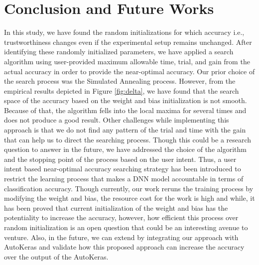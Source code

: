 \section{Conclusion and Future Works}
\label{sec:future}
In this study, we have found the random initializations for which accuracy i.e., trustworthiness changes even if the experimental setup remains unchanged. After identifying these randomly initialized parameters, we have applied a search algorithm using user-provided maximum allowable time, trial, and gain from the actual accuracy in order to provide the near-optimal accuracy. Our prior choice of the search process was the Simulated Annealing process. However, from the empirical results depicted in Figure \ref{fig:delta}, we have found that the search space of the accuracy based on the weight and bias initialization is not smooth. Because of that, the algorithm fells into the local maxima for several times and does not produce a good result. Other challenges while implementing this approach is that we do not find any pattern of the trial and time with the gain that can help us to direct the searching process. Though this could be a research question to answer in the future, we have addressed the choice of the algorithm and the stopping point of the process based on the user intent.
Thus, a user intent based near-optimal accuracy searching strategy has been introduced to restrict the learning process that makes a DNN model accountable in terms of classification accuracy. Though currently, our work reruns the training process by modifying the weight and bias, the resource cost for the work is high and while, it has been proved that current initialization of the weight and bias has the potentiality to increase the accuracy, however, how efficient this process over random initialization is an open question that could be an interesting avenue to venture. Also, in the future, we can extend by integrating our approach with AutoKeras \cite{jin2019auto} and validate how this proposed approach can increase the accuracy over the output of the AutoKeras.

